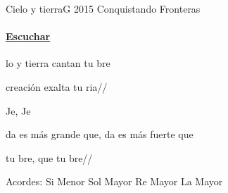 \documentclass[12pt, spanish]{book}
\begin{document}
    \begin{song}{Cielo y tierra}{G}
        {2015} %
        {Conquistando Fronteras}
        {} %
        {}
        \ifChordBk
        \paragraph{\mbox{}\hfill\protect\href{https://open.spotify.com/intl-es/track/03d9JfhlVHutoQhuxIhFGu}{Escuchar}\mbox{}\hfill}
        \fi


        \begin{SBOpGroup}
            lo y tierra cantan tu bre

             creación exalta tu ria//
        \end{SBOpGroup}

        \begin{SBChorus}
            Je, Je
        \end{SBChorus}

        \begin{SBOpGroup}
            da es más grande que, da es más fuerte que

            tu bre, que tu bre//
        \end{SBOpGroup}

        \ifChordBk
        \begin{SBOpGroup}
            Acordes:\break
            \upchord{\Bm}\qquad Si Menor \hfill
            \upchord{\G}\qquad Sol Mayor \hfill\null\break
            \upchord{\D}\qquad Re Mayor \hfill
            \upchord{\A}\qquad La Mayor \hfill\null\break
        \end{SBOpGroup}
        \fi
    \end{song}
\end{document}
